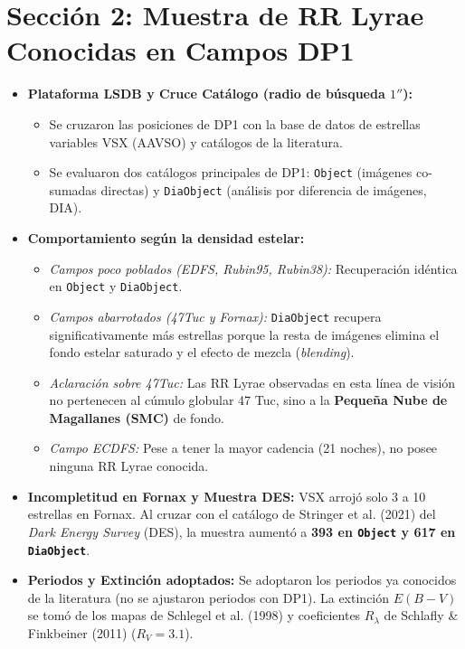 \documentclass[11pt,a4paper]{article}
\begin{document}
\section{Sección 2: Muestra de RR Lyrae Conocidas en Campos DP1}
\begin{itemize}
    \item \textbf{Plataforma LSDB y Cruce Catálogo (radio de búsqueda $1''$):}
    \begin{itemize}
        \item Se cruzaron las posiciones de DP1 con la base de datos de estrellas variables VSX (AAVSO) y catálogos de la literatura.
        \item Se evaluaron dos catálogos principales de DP1: \texttt{Object} (imágenes co-sumadas directas) y \texttt{DiaObject} (análisis por diferencia de imágenes, DIA).
    \end{itemize}
    \item \textbf{Comportamiento según la densidad estelar:}
    \begin{itemize}
        \item \textit{Campos poco poblados (EDFS, Rubin95, Rubin38):} Recuperación idéntica en \texttt{Object} y \texttt{DiaObject}.
        \item \textit{Campos abarrotados (47Tuc y Fornax):} \texttt{DiaObject} recupera significativamente más estrellas porque la resta de imágenes elimina el fondo estelar saturado y el efecto de mezcla (\textit{blending}).
        \item \textit{Aclaración sobre 47Tuc:} Las RR Lyrae observadas en esta línea de visión no pertenecen al cúmulo globular 47 Tuc, sino a la \textbf{Pequeña Nube de Magallanes (SMC)} de fondo.
        \item \textit{Campo ECDFS:} Pese a tener la mayor cadencia (21 noches), no posee ninguna RR Lyrae conocida.
    \end{itemize}
    \item \textbf{Incompletitud en Fornax y Muestra DES:} VSX arrojó solo 3 a 10 estrellas en Fornax. Al cruzar con el catálogo de Stringer et al. (2021) del \textit{Dark Energy Survey} (DES), la muestra aumentó a \textbf{393 en \texttt{Object} y 617 en \texttt{DiaObject}}.
    \item \textbf{Periodos y Extinción adoptados:} Se adoptaron los periodos ya conocidos de la literatura (no se ajustaron periodos con DP1). La extinción $E(B-V)$ se tomó de los mapas de Schlegel et al. (1998) y coeficientes $R_\lambda$ de Schlafly \& Finkbeiner (2011) ($R_V = 3.1$).
\end{itemize}
\end{document}
